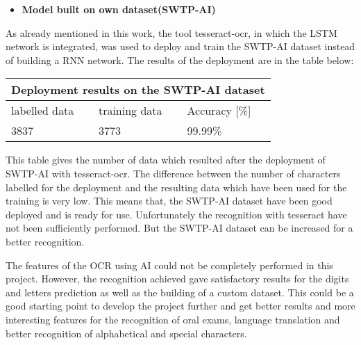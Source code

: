 \begin{itemize} \bfseries
    \item \textbf{Model built on own dataset(SWTP-AI)}
\end{itemize}

\noindent
As already mentioned in this work, the tool tesseract-ocr, in which the LSTM network is integrated, was used to deploy and train 
the SWTP-AI dataset instead of building a RNN network. 
The results of the deployment are in the table below: \hfill \break 

\begin{tabular} {|p{3cm}||p{3cm}|p{3cm}|} 
    \hline 
    
    \multicolumn{3}{|c|}{Deployment results on the  SWTP-AI dataset} \\
    \hline
    labelled data     &training data    &Accuracy [\%]\\ 
    \hline
    3837              &3773     	    &99.99\%\\
    
    \hline
   \end{tabular} \hfill \break 

\noindent
This table gives the number of data which resulted after the deployment of SWTP-AI with tesseract-ocr.
The difference between the number of characters labelled for the deployment and the resulting data which
have been used for the training is very low. 
This means that, the SWTP-AI dataset have been good deployed and is ready for use. 
Unfortunately the recognition with tesseract have not been sufficiently performed. But the SWTP-AI dataset can be 
increased for a better recognition.  \hfill \break 

\noindent
The features of the OCR using AI could not be completely performed in this project.
However, the recognition achieved gave satisfactory results for the digits and letters prediction as well 
as the building of a custom dataset.
This could be a good starting point to develop the project further and get better results and more interesting features
for the recognition of oral exams, language translation and better recognition of alphabetical and special characters. 
